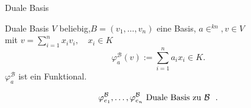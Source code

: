 \documentclass[class=article, crop=false]{standalone}
\begin{document}
\begin{zettel}{Duale Basis}
\begin{flashcard}[8phfju37]{Duale Basis}
	$V$ beliebig,$B = ( v_1,\dots,v_n)$ eine Basis, $a \in^{kn}, v \in  V $\\
	mit $v = \sum_{i = 1}^{n} x_i v_i, \quad x_i \in  K$
	\[
		\varphi_a^{\mathcal B }(v) := \sum_{i = 1}^{n} a_i x_i   \in  K
	.\]
	$\varphi_a^{\mathcal B }$ ist ein Funktional.
	\begin{definition}
		\[
			\varphi^{\mathcal B}_{e_1},\dots,\varphi^{\mathcal B}_{e_n} \tx{Duale Basis zu $\mathcal B$ }
		.\]
	\end{definition}
\end{flashcard}
\end{zettel}
\end{document}
